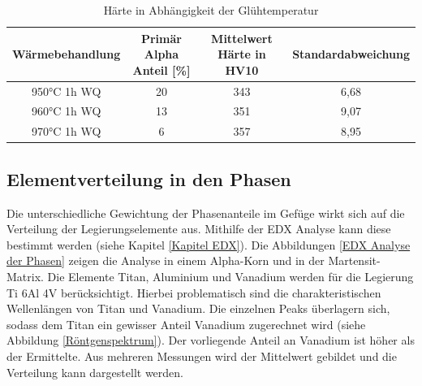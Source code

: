 \documentclass[a4paper, 11pt]{tubsreprt}
\begin{document}
\begin{table}	%
\begin{tabular}{c|c|c|c}
Wärmebehandlung	& Primär Alpha Anteil [\%] &	Mittelwert 
Härte in HV10 	& Standardabweichung \\
\hline
950°C 1h WQ	& 	20	&	343	&	6,68 \\
960°C 1h WQ	&	13	&	351	&	9,07 \\
970°C 1h WQ	&	6	&	357	&	8,95 \\

\end{tabular}
\caption{Härte in Abhängigkeit der Glühtemperatur}
\label{Härte in Abhängigkeit der Glühtemperatur}
\end{table}

\subsection{Elementverteilung in den Phasen}
Die unterschiedliche Gewichtung der Phasenanteile im Gefüge wirkt sich auf die Verteilung der Legierungselemente aus. Mithilfe der EDX Analyse kann diese bestimmt werden (siehe Kapitel \ref{Kapitel EDX}). Die Abbildungen \ref{EDX Analyse der Phasen} zeigen die Analyse in einem Alpha-Korn und in der Martensit-Matrix. Die Elemente Titan, Aluminium und Vanadium werden für die Legierung Ti 6Al 4V berücksichtigt. Hierbei problematisch sind die charakteristischen Wellenlängen von Titan und Vanadium. Die einzelnen Peaks überlagern sich, sodass dem Titan ein gewisser Anteil Vanadium zugerechnet wird (siehe Abbildung \ref{Röntgenspektrum}). Der vorliegende Anteil an Vanadium ist höher als der Ermittelte. Aus mehreren Messungen wird der Mittelwert gebildet und die Verteilung kann dargestellt werden.
\end{document}
